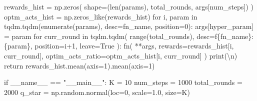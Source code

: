 \documentclass[
  letterpaper,
]{krantz}
\makeatletter
\newenvironment{Shaded}{\begin{snugshade}}{\end{snugshade}}
\newcommand{\BuiltInTok}[1]{\textcolor[rgb]{0.00,0.23,0.31}{#1}}
\newcommand{\CharTok}[1]{\textcolor[rgb]{0.13,0.47,0.30}{#1}}
\newcommand{\ControlFlowTok}[1]{\textcolor[rgb]{0.00,0.23,0.31}{#1}}
\newcommand{\DecValTok}[1]{\textcolor[rgb]{0.68,0.00,0.00}{#1}}
\newcommand{\FloatTok}[1]{\textcolor[rgb]{0.68,0.00,0.00}{#1}}
\newcommand{\KeywordTok}[1]{\textcolor[rgb]{0.00,0.23,0.31}{#1}}
\newcommand{\NormalTok}[1]{\textcolor[rgb]{0.00,0.23,0.31}{#1}}
\newcommand{\OperatorTok}[1]{\textcolor[rgb]{0.37,0.37,0.37}{#1}}
\newcommand{\SpecialCharTok}[1]{\textcolor[rgb]{0.37,0.37,0.37}{#1}}
\newcommand{\SpecialStringTok}[1]{\textcolor[rgb]{0.13,0.47,0.30}{#1}}
\newcommand{\StringTok}[1]{\textcolor[rgb]{0.13,0.47,0.30}{#1}}
\newcommand{\VariableTok}[1]{\textcolor[rgb]{0.07,0.07,0.07}{#1}}
\newenvironment{kframe}{%
\medskip{}
\setlength{\fboxsep}{.8em}
 \def\at@end@of@kframe{}%
 \ifinner\ifhmode%
  \def\at@end@of@kframe{\end{minipage}}%
  \begin{minipage}{\columnwidth}%
 \fi\fi%
 \def\FrameCommand##1{\hskip\@totalleftmargin \hskip-\fboxsep
 \colorbox{shadecolor}{##1}\hskip-\fboxsep
     \hskip-\linewidth \hskip-\@totalleftmargin \hskip\columnwidth}%
 \MakeFramed {\advance\hsize-\width
   \@totalleftmargin\z@ \linewidth\hsize
   \@setminipage}}%
 {\par\unskip\endMakeFramed%
 \at@end@of@kframe}
\renewenvironment{Shaded}{\begin{kframe}}{\end{kframe}}
\theoremstyle{plain}
\theoremstyle{definition}
\theoremstyle{definition}
\theoremstyle{remark}
\makeatother
\begin{document}
\begin{codelisting}
\begin{Shaded}
\begin{Highlighting}[]
\NormalTok{    rewards\_hist }\OperatorTok{=}\NormalTok{ np.zeros(}
\NormalTok{        shape}\OperatorTok{=}\NormalTok{(}\BuiltInTok{len}\NormalTok{(params), total\_rounds, args[}\StringTok{\textquotesingle{}num\_steps\textquotesingle{}}\NormalTok{])}
\NormalTok{        )}
\NormalTok{    optm\_acts\_hist }\OperatorTok{=}\NormalTok{ np.zeros\_like(rewards\_hist)}
    \ControlFlowTok{for}\NormalTok{ i, param }\KeywordTok{in}\NormalTok{ tqdm.tqdm(}\BuiltInTok{enumerate}\NormalTok{(params), desc}\OperatorTok{=}\NormalTok{fn\_name, position}\OperatorTok{=}\DecValTok{0}\NormalTok{):}
\NormalTok{        args[hyper\_param] }\OperatorTok{=}\NormalTok{ param}
        \ControlFlowTok{for}\NormalTok{ curr\_round }\KeywordTok{in}\NormalTok{ tqdm.tqdm(}
                \BuiltInTok{range}\NormalTok{(total\_rounds),}
\NormalTok{                desc}\OperatorTok{=}\SpecialStringTok{f\textquotesingle{}}\SpecialCharTok{\{}\NormalTok{fn\_name}\SpecialCharTok{\}}\SpecialStringTok{: }\SpecialCharTok{\{}\NormalTok{param}\SpecialCharTok{\}}\SpecialStringTok{\textquotesingle{}}\NormalTok{,}
\NormalTok{                position}\OperatorTok{=}\NormalTok{i}\OperatorTok{+}\DecValTok{1}\NormalTok{,}
\NormalTok{                leave}\OperatorTok{=}\VariableTok{True}
\NormalTok{                ):}
\NormalTok{            fn(}
                \OperatorTok{**}\NormalTok{args,}
\NormalTok{                rewards}\OperatorTok{=}\NormalTok{rewards\_hist[i, curr\_round],}
\NormalTok{                optim\_acts\_ratio}\OperatorTok{=}\NormalTok{optm\_acts\_hist[i, curr\_round]}
\NormalTok{                )}
    \BuiltInTok{print}\NormalTok{(}\StringTok{\textquotesingle{}}\CharTok{\textbackslash{}n}\StringTok{\textquotesingle{}}\NormalTok{)}
    \ControlFlowTok{return}\NormalTok{ rewards\_hist.mean(axis}\OperatorTok{=}\DecValTok{1}\NormalTok{).mean(axis}\OperatorTok{=}\DecValTok{1}\NormalTok{)}


\ControlFlowTok{if} \VariableTok{\_\_name\_\_} \OperatorTok{==} \StringTok{"\_\_main\_\_"}\NormalTok{:}
\NormalTok{    K }\OperatorTok{=} \DecValTok{10}
\NormalTok{    num\_steps }\OperatorTok{=} \DecValTok{1000}
\NormalTok{    total\_rounds }\OperatorTok{=} \DecValTok{2000}
\NormalTok{    q\_star }\OperatorTok{=}\NormalTok{ np.random.normal(loc}\OperatorTok{=}\DecValTok{0}\NormalTok{, scale}\OperatorTok{=}\FloatTok{1.0}\NormalTok{, size}\OperatorTok{=}\NormalTok{K)}
    

\end{Highlighting}
\end{Shaded}
\end{codelisting}
\end{document}
